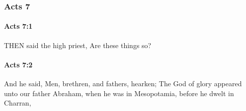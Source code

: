 	\subsubsection{Acts 7} %
		\label{ACTS-7}
		
		\paragraph{Acts 7:1} %
			\label{ACTS-7-1}

			THEN said the high priest, Are these things so?

			\begin{framed}
			\scriptsize
				\begin{compactdesc}
					\item[SBLG] 
				\end{compactdesc}
			\end{framed}

		\paragraph{Acts 7:2} %
			\label{ACTS-7-2}

			And he said, Men, brethren, and fathers, hearken; The God of glory appeared unto our father Abraham, when he was in Mesopotamia, before he dwelt in Charran,


